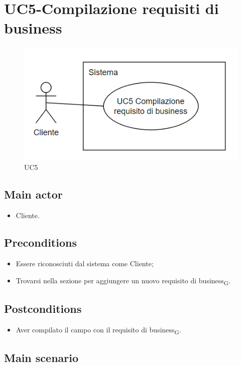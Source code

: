 \documentclass{article}
\begin{document}
\section{UC5-Compilazione requisiti di business}
    \begin{figure}[H]
      \centering
      \includegraphics[width=.8\textwidth, height=.6\textheight, keepaspectratio]{documenti/imgUML/UC5-COMPILAZIONE-REQUISITO-DI-BUSINESS.png}
            \caption{UC5}
      \label{fig:UC5}
    \end{figure}
     \subsection*{Main actor}
     \begin{itemize}
         \item Cliente.
     \end{itemize}
     \subsection*{Preconditions} 
     \begin{itemize}
         \item Essere riconosciuti dal sistema come Cliente;
         \item Trovarsi nella sezione per aggiungere un nuovo requisito di business\textsubscript{G}.
     \end{itemize}
     \subsection*{Postconditions} 
        \begin{itemize}
         \item Aver compilato il campo con il requisito di business\textsubscript{G}.
        \end{itemize}
        
     \subsection*{Main scenario}
\end{document}
